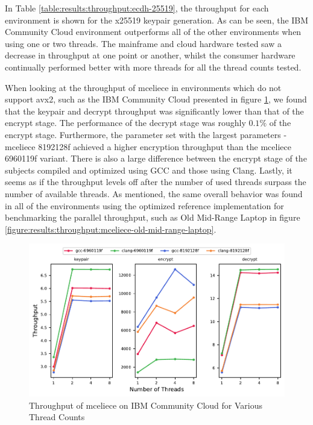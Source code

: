 In Table \ref{table:results:throughput:ecdh-25519}, the throughput for each environment is shown for the \gls{x25519} keypair generation. As can be seen, the IBM Community Cloud environment outperforms all of the other environments when using one or two threads. The mainframe and cloud hardware tested saw a decrease in throughput at one point or another, whilst the consumer hardware continually performed better with more threads for all the thread counts tested.



When looking at the throughput of \gls{mceliece} in environments which do not support \gls{avx2}, such as the IBM Community Cloud presented in figure \ref{figure:results:throughput:mceliece-ibm-community-cloud}, we found that the keypair and decrypt throughput was significantly lower than that of the encrypt stage. The performance of the decrypt stage was roughly $0.1\%$ of the encrypt stage. Furthermore, the parameter set with the largest parameters - \gls{mceliece} 8192128f achieved a higher encryption throughput than the \gls{mceliece} 6960119f variant. There is also a large difference between the encrypt stage of the subjects compiled and optimized using GCC and those using Clang. Lastly, it seems as if the throughput levels off after the number of used threads surpass the number of available threads. As mentioned, the same overall behavior was found in all of the environments using the optimized reference implementation for benchmarking the parallel throughput, such as Old Mid-Range Laptop in figure \ref{figure:results:throughput:mceliece-old-mid-range-laptop}.

\begin{figure}
    \centering
    \includegraphics[scale=0.75]{chapters/results/throughput/IBM Community Cloud_mceliece.pdf}
    \caption{Throughput of \gls{mceliece} on IBM Community Cloud for Various Thread Counts}
    \label{figure:results:throughput:mceliece-ibm-community-cloud}
\end{figure} 

